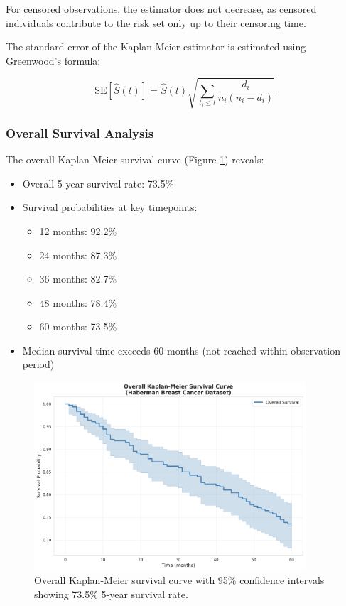 \documentclass[12pt,a4paper]{article}
\begin{document}
For censored observations, the estimator does not decrease, as censored individuals contribute to the risk set only up to their censoring time.

The standard error of the Kaplan-Meier estimator is estimated using Greenwood's formula:

\begin{equation}
\text{SE}[\hat{S}(t)] = \hat{S}(t) \sqrt{\sum_{t_i \leq t} \frac{d_i}{n_i(n_i - d_i)}}
\label{eq:km_variance}
\end{equation}

\subsubsection{Overall Survival Analysis}

The overall Kaplan-Meier survival curve (Figure \ref{fig:km_overall}) reveals:

\begin{itemize}
    \item Overall 5-year survival rate: 73.5\%
    \item Survival probabilities at key timepoints:
    \begin{itemize}
        \item 12 months: 92.2\%
        \item 24 months: 87.3\%
        \item 36 months: 82.7\%
        \item 48 months: 78.4\%
        \item 60 months: 73.5\%
    \end{itemize}
    \item Median survival time exceeds 60 months (not reached within observation period)
\end{itemize}

\begin{figure}[H]
\centering
\includegraphics[width=0.9\textwidth]{kaplan_meier_overall.png}
\caption{Overall Kaplan-Meier survival curve with 95\% confidence intervals showing 73.5\% 5-year survival rate.}
\label{fig:km_overall}
\end{figure}
\end{document}
